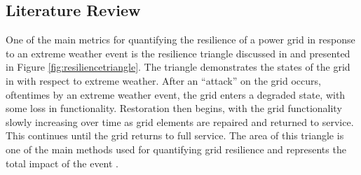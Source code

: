 \documentclass[12pt]{article}
\begin{document}
\subsection{Literature Review} \label{LitReview}
One of the main metrics for quantifying the resilience of a power grid in response to an extreme weather event is the resilience triangle discussed in \cite{Jufri} and presented in Figure \ref{fig:resiliencetriangle}. The triangle demonstrates the states of the grid in with respect to extreme weather. After an “attack” on the grid occurs, oftentimes by an extreme weather event, the grid enters a degraded state, with some loss in functionality.  Restoration then begins, with the grid functionality slowly increasing over time as grid elements are repaired and returned to service. This continues until the grid returns to full service. The area of this triangle is one of the main methods used for quantifying grid resilience and represents the total impact of the event \cite{Jufri}.  \par
\end{document}
